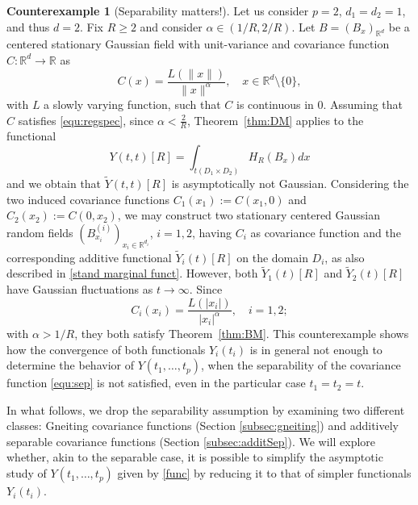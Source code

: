 \documentclass[12pt]{article}
\DeclareMathOperator{\1}{1}
\newcommand{\R}{\mathbb{R}}
\theoremstyle{plain}
\theoremstyle{definition}
\newtheorem{counterexample}{Counterexample}[section]
\begin{document}
\begin{counterexample}[Separability matters!]\label{ex:sepmatters} Let us consider $p=2$, $d_1=d_2=1$, and thus $d=2$. Fix $R\ge 2$ and consider $\alpha \in (1/R,2/R)$. Let $B=(B_x)_{\R^d}$ be a centered stationary Gaussian field with unit-variance and covariance function $C:\R^d\to \R$ as \begin{equation}
    C(x) = \frac{L(\|x\|)}{\|x\|^\alpha }, \quad x\in \R^d\setminus\{0\},
\end{equation}
with $L$ a slowly varying function, such that $C$ is continuous in $0$. Assuming that $C$ satisfies \eqref{equ:regspec}, since $\alpha<\frac2R$,  Theorem~\ref{thm:DM} applies to the functional \begin{equation}
    Y(t,t)[R] = \int_{t(D_1\times D_2)} H_R(B_x)dx
\end{equation} 
and we obtain that $\widetilde Y(t,t)[R]$ is asymptotically not Gaussian. {Considering the two induced covariance functions $C_{1}(x_{1}):=C(x_{1},0)$ and $C_{2}(x_{2}):=C(0, x_{2})$, we may construct two stationary centered Gaussian random fields $(B^{(i)}_{x_{i}})_{x_{i}\in\mathbb R^{d_{i}}}$, $i=1,2$, having $C_{i}$ as covariance function and the corresponding additive functional $\widetilde Y_i(t)[R]$ on the domain $D_{i}$, as also described in \eqref{stand marginal funct}.} However, both $\widetilde Y_1(t)[R] $ and $\widetilde Y_2(t)[R] $ have Gaussian fluctuations as $t\to\infty$. Since \begin{equation}
    C_i(x_i) = \frac{L(|x_i|)}{|x_i|^\alpha } , \quad i=1,2;
\end{equation} 
with $\alpha > 1/R$, they both satisfy Theorem~\ref{thm:BM}. This counterexample shows how the convergence of both functionals $Y_i(t_i)$ is in general not enough to determine the behavior of $Y(t_1,\ldots,t_p)$, when the separability of the covariance function \eqref{equ:sep} is not satisfied, {even in the particular case $t_{1}=t_{2}=t$}.
\end{counterexample}


In what follows, we drop the separability assumption by examining
two different classes: Gneiting covariance functions (Section \ref{subsec:gneiting}) and additively separable covariance functions (Section \ref{subsec:additSep}). We will explore whether, akin to the separable case, it is possible to simplify the asymptotic study of 
$Y(t_1,\dots,t_p)$ given by \eqref{func} by reducing it to that of simpler functionals $Y_i(t_i)$.
\end{document}
